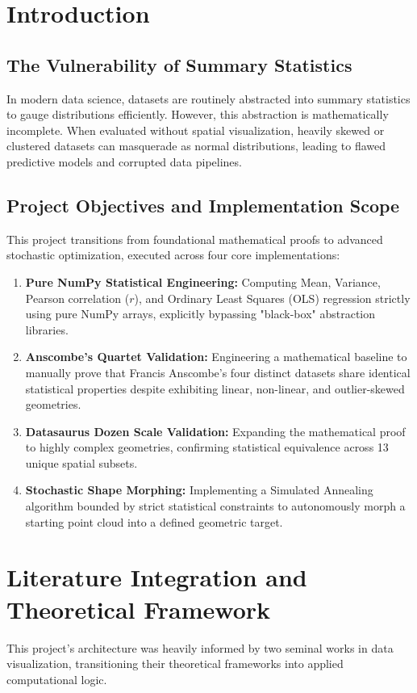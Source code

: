 \documentclass[12pt, a4paper]{article}
\begin{document}
\section{Introduction}
\subsection{The Vulnerability of Summary Statistics}
In modern data science, datasets are routinely abstracted into summary statistics to gauge distributions efficiently. However, this abstraction is mathematically incomplete. When evaluated without spatial visualization, heavily skewed or clustered datasets can masquerade as normal distributions, leading to flawed predictive models and corrupted data pipelines.

\subsection{Project Objectives and Implementation Scope}
This project transitions from foundational mathematical proofs to advanced stochastic optimization, executed across four core implementations:
\begin{enumerate}
    \item \textbf{Pure NumPy Statistical Engineering:} Computing Mean, Variance, Pearson correlation ($r$), and Ordinary Least Squares (OLS) regression strictly using pure NumPy arrays, explicitly bypassing "black-box" abstraction libraries.
    \item \textbf{Anscombe's Quartet Validation:} Engineering a mathematical baseline to manually prove that Francis Anscombe's four distinct datasets share identical statistical properties despite exhibiting linear, non-linear, and outlier-skewed geometries.
    \item \textbf{Datasaurus Dozen Scale Validation:} Expanding the mathematical proof to highly complex geometries, confirming statistical equivalence across 13 unique spatial subsets.
    \item \textbf{Stochastic Shape Morphing:} Implementing a Simulated Annealing algorithm bounded by strict statistical constraints to autonomously morph a starting point cloud into a defined geometric target.
\end{enumerate}

\newpage
\section{Literature Integration and Theoretical Framework}
This project's architecture was heavily informed by two seminal works in data visualization, transitioning their theoretical frameworks into applied computational logic.
\end{document}
